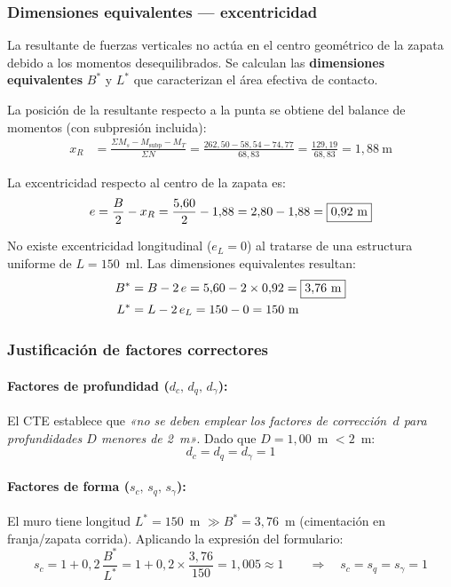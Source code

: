 \subsubsection{Dimensiones equivalentes — excentricidad}

La resultante de fuerzas verticales no actúa en el centro geométrico de la zapata
debido a los momentos desequilibrados. Se calculan las \textbf{dimensiones
equivalentes} $B^*$ y $L^*$ que caracterizan el área efectiva de contacto.

La posición de la resultante respecto a la punta se obtiene del balance de
momentos (con subpresión incluida):
\begin{align*}
  x_R &= \frac{\Sigma M_s - M_\text{subp} - M_T}{\Sigma N}
       = \frac{262{,}50 - 58{,}54 - 74{,}77}{68{,}83}
       = \frac{129{,}19}{68{,}83} = 1{,}88~\text{m}
\end{align*}

La excentricidad respecto al centro de la zapata es:
\begin{equation}
  e = \frac{B}{2} - x_R = \frac{5{,}60}{2} - 1{,}88 = 2{,}80 - 1{,}88
    = \boxed{0{,}92~\text{m}}
  \label{eq:excentricidad_mensula}
\end{equation}

No existe excentricidad longitudinal ($e_L = 0$) al tratarse de una estructura
uniforme de $L = 150$~ml. Las dimensiones equivalentes resultan:
\begin{align}
  B^* &= B - 2\,e = 5{,}60 - 2 \times 0{,}92 = \boxed{3{,}76~\text{m}}
        \label{eq:B_estrella} \\
  L^* &= L - 2\,e_L = 150 - 0 = 150~\text{m}
        \label{eq:L_estrella}
\end{align}

\subsubsection{Justificación de factores correctores}

\paragraph{Factores de profundidad ($d_c,\, d_q,\, d_\gamma$):}
El CTE establece que \emph{«no se deben emplear los factores de corrección~$d$
para profundidades $D$ menores de 2~m»}. Dado que $D = 1{,}00$~m $< 2$~m:
\[
  d_c = d_q = d_\gamma = 1
\]

\paragraph{Factores de forma ($s_c,\, s_q,\, s_\gamma$):}
El muro tiene longitud $L^* = 150$~m $\gg B^* = 3{,}76$~m (cimentación en
franja/zapata corrida). Aplicando la expresión del formulario:
\[
  s_c = 1 + 0{,}2\,\frac{B^*}{L^*}
      = 1 + 0{,}2 \times \frac{3{,}76}{150} = 1{,}005 \approx 1
  \qquad \Rightarrow \quad s_c = s_q = s_\gamma = 1
\]

